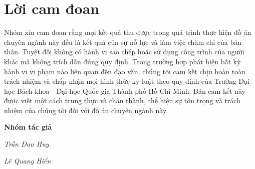 \section*{Lời cam đoan}
\thispagestyle{empty}

\hspace*{0.5cm} Nhóm xin cam đoan rằng mọi kết quả thu được trong quá trình thực hiện đồ án chuyên ngành này đều là kết quả của sự nỗ lực và làm việc chăm chỉ của bản thân. Tuyệt đối không có hành vi sao chép hoặc sử dụng công trình của người khác mà không trích dẫn đúng quy định. Trong trường hợp phát hiện bất kỳ hành vi vi phạm nào liên quan đến đạo văn, chúng tôi cam kết chịu hoàn toàn trách nhiệm và chấp nhận mọi hình thức kỷ luật theo quy định của Trường Đại học Bách khoa - Đại học Quốc gia Thành phố Hồ Chí Minh. Bản cam kết này được viết một cách trung thực và chân thành, thể hiện sự tôn trọng và trách nhiệm của chúng tôi đối với đồ án chuyên ngành này.
\par\hfill\textbf{Nhóm tác giả}\hspace{1cm}
\par\hfill\textit{Trần Đan Huy}\hspace{1cm}
\par\hfill\textit{Lê Quang Hiển}\hspace{1cm}
\clearpage
{}
